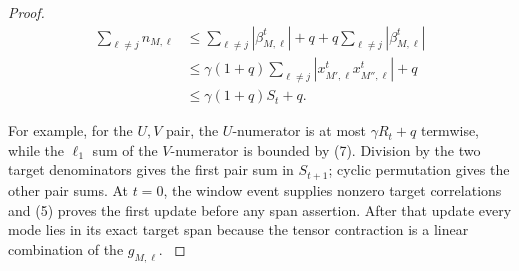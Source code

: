 \begin{lemma}
\begin{proof}
\[
\begin{aligned}
\sum_{\ell\ne j}n_{M,\ell}
&\le \sum_{\ell\ne j}|\beta_{M,\ell}^t|
 +q+q\sum_{\ell\ne j}|\beta_{M,\ell}^t|\\
&\le\gamma(1+q)\sum_{\ell\ne j}
|x_{M',\ell}^tx_{M'',\ell}^t|+q\\
&\le\gamma(1+q)S_t+q.
\end{aligned}
\tag{7}
\]

For example, for the \(U,V\) pair, the \(U\)-numerator is at most
\(\gamma R_t+q\) termwise, while the \(\ell_1\) sum of the \(V\)-numerator
is bounded by (7). Division by the two target denominators gives the first
pair sum in \(S_{t+1}\); cyclic permutation gives the other pair sums. At
\(t=0\), the window event supplies nonzero target correlations and (5)
proves the first update before any span assertion. After that update every
mode lies in its exact target span because the tensor contraction is a linear
combination of the \(g_{M,\ell}\). \(\)


\end{proof}
\end{lemma}
